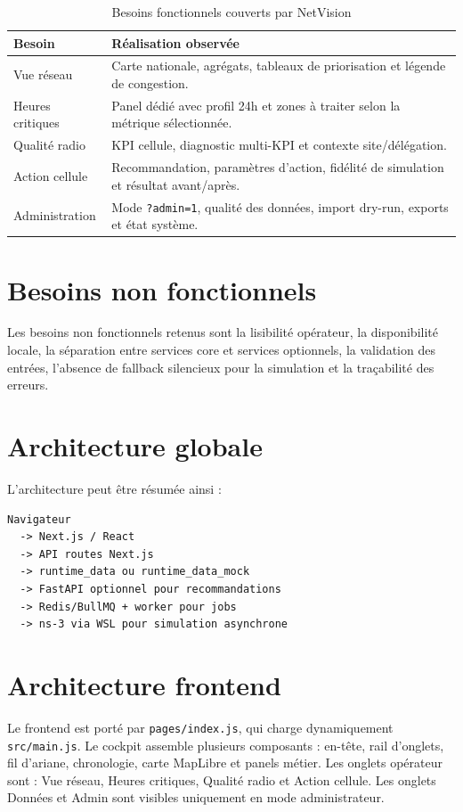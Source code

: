 \documentclass[12pt,a4paper,oneside]{report}
\begin{document}
\begin{table}[H]
\centering
\caption{Besoins fonctionnels couverts par NetVision}
\label{tab:besoins-fonctionnels}
\begin{tabularx}{\textwidth}{p{4cm}X}
\toprule
\textbf{Besoin} & \textbf{Réalisation observée} \\
\midrule
Vue réseau & Carte nationale, agrégats, tableaux de priorisation et légende de congestion. \\
Heures critiques & Panel dédié avec profil 24h et zones à traiter selon la métrique sélectionnée. \\
Qualité radio & KPI cellule, diagnostic multi-KPI et contexte site/délégation. \\
Action cellule & Recommandation, paramètres d'action, fidélité de simulation et résultat avant/après. \\
Administration & Mode \texttt{?admin=1}, qualité des données, import dry-run, exports et état système. \\
\bottomrule
\end{tabularx}
\end{table}

\section{Besoins non fonctionnels}
Les besoins non fonctionnels retenus sont la lisibilité opérateur, la disponibilité locale, la séparation entre services core et services optionnels, la validation des entrées, l'absence de fallback silencieux pour la simulation et la traçabilité des erreurs.

\section{Architecture globale}
L'architecture peut être résumée ainsi :
\begin{lstlisting}
Navigateur
  -> Next.js / React
  -> API routes Next.js
  -> runtime_data ou runtime_data_mock
  -> FastAPI optionnel pour recommandations
  -> Redis/BullMQ + worker pour jobs
  -> ns-3 via WSL pour simulation asynchrone
\end{lstlisting}

\section{Architecture frontend}
Le frontend est porté par \texttt{pages/index.js}, qui charge dynamiquement \texttt{src/main.js}. Le cockpit assemble plusieurs composants : en-tête, rail d'onglets, fil d'ariane, chronologie, carte MapLibre et panels métier. Les onglets opérateur sont : Vue réseau, Heures critiques, Qualité radio et Action cellule. Les onglets Données et Admin sont visibles uniquement en mode administrateur.
\end{document}
